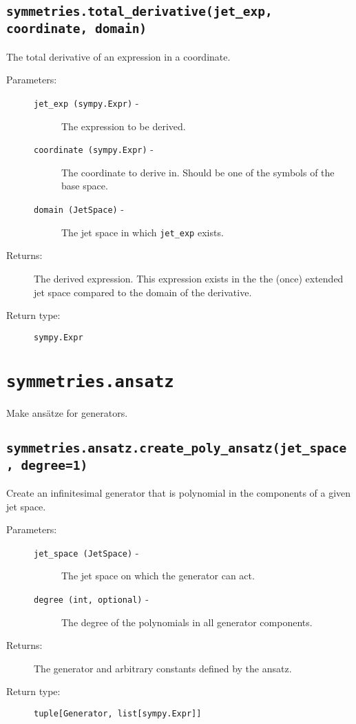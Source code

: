 \subsection*{\lstinline{symmetries.total_derivative(jet_exp, coordinate, domain)}}

   The total derivative of an expression in a coordinate.

   \begin{description}
      \item[Parameters:] \leavevmode
        \begin{description}
            \item[\lstinline{jet_exp (sympy.Expr)} -] The expression to be derived.
            \item[\lstinline{coordinate (sympy.Expr)} -] The coordinate to derive in. Should be one of the symbols of the base space.
            \item[\lstinline{domain (JetSpace)} -] The jet space in which \lstinline{jet_exp} exists.
        \end{description}
      \item[Returns:] The derived expression. This expression exists in the the (once) extended jet space compared to the domain of the derivative.
      \item[Return type:] \lstinline{sympy.Expr}
   \end{description}

\section*{\lstinline{symmetries.ansatz}}

Make ansätze for generators.

\subsection*{\lstinline{symmetries.ansatz.create_poly_ansatz(jet_space, degree=1)}}

   Create an infinitesimal generator that is polynomial in the
   components of a given jet space.

   \begin{description}
      \item[Parameters:] \leavevmode
        \begin{description}
            \item[\lstinline{jet_space (JetSpace)} -] The jet space on which the generator can act.
            \item[\lstinline{degree (int, optional)} -] The degree of the polynomials in all generator components.
        \end{description}
      \item[Returns:] The generator and arbitrary constants defined by the ansatz.
      \item[Return type:] \lstinline{tuple[Generator, list[sympy.Expr]]}
   \end{description}

